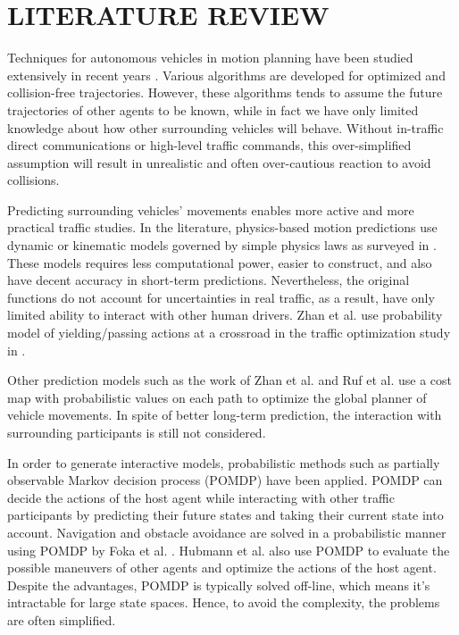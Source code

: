 \documentclass[twocolumn,10pt]{asme2e}
\begin{document}

\section{LITERATURE REVIEW}
Techniques for autonomous vehicles in motion planning have been studied extensively in recent years \cite{motion_planning}. Various algorithms are developed for optimized and collision-free trajectories. However, these algorithms tends to assume the future trajectories of other agents to be known, while in fact we have only limited knowledge about how other surrounding vehicles will behave. Without in-traffic direct communications or high-level traffic commands, this over-simplified assumption will result in unrealistic and often over-cautious reaction to avoid collisions.

Predicting surrounding vehicles' movements enables more active and more practical traffic studies. In the literature, physics-based motion predictions use dynamic or kinematic models governed by simple physics laws as surveyed in \cite{survey_motion_prediction}. These models requires less computational power, easier to construct, and also have decent accuracy in short-term predictions\cite{physics_real_time, physics_velocity_obstacle}. Nevertheless, the original functions do not account for uncertainties in real traffic, as a result, have only limited ability to interact with other human drivers. Zhan et al. use  probability model of yielding/passing actions at a crossroad in the traffic optimization study in \cite{non-conservative}.

Other prediction models such as the work of Zhan et al. and Ruf et al. \cite{sparc} use a cost map with probabilistic values on each path to optimize the global planner of vehicle movements. In spite of better long-term prediction, the interaction with surrounding participants is still not considered.

In order to generate interactive models, probabilistic methods such as partially observable Markov decision process (POMDP) have been applied.  POMDP can decide the actions of the host agent while interacting with other traffic participants by predicting their future states and taking their current state into account. Navigation and obstacle avoidance are solved in a probabilistic manner using POMDP by Foka et al. \cite{Foka}. Hubmann et al. \cite{state_uncertain_environment} also use POMDP to evaluate the possible maneuvers of other agents and optimize the actions of the host agent. Despite the advantages, POMDP is typically solved off-line, which means it's intractable for large state spaces. Hence, to avoid the complexity, the problems are often simplified.
\end{document}
